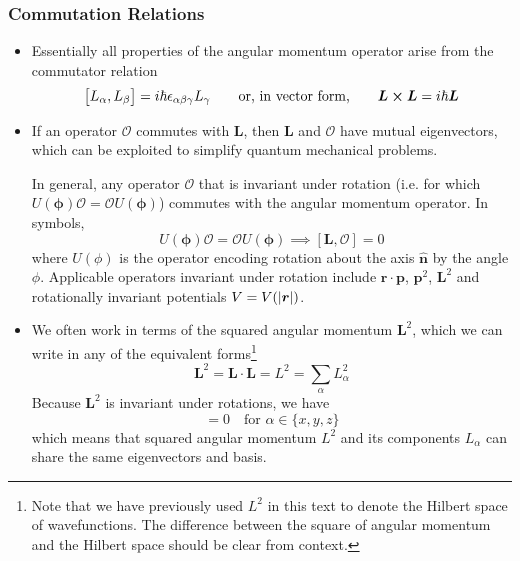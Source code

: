 \documentclass[11pt, a4paper]{article}
\newcommand{\eqtext}[1]{\qquad \text{#1} \qquad}
\renewcommand{\vec}[1]{\bm{#1}}  %
\newcommand{\uvec}[1]{\hat{\vec{#1}}}  %
\renewcommand{\r}{\vec{r}}  %
\renewcommand{\L}{\vec{L}}  %
\renewcommand{\O}{\mathcal{O}}  %
\begin{document}
\subsubsection{Commutation Relations}
\begin{itemize}
	\item Essentially all properties of the angular momentum operator arise from the commutator relation
	\begin{equation*}
		\big[L_{\alpha}, L_{\beta}\big] = i \hbar \epsilon_{\alpha \beta \gamma}L_{\gamma} \eqtext{or, in vector form,} \L \cross \L = i \hbar \L
	\end{equation*}
	
	\item If an operator $ \O $ commutes with $ \L $, then $ \L $ and $ \O $ have mutual eigenvectors, which can be exploited to simplify quantum mechanical problems.  
	
	In general, any operator $ \O $ that is invariant under rotation (i.e. for which $ U(\vec{\phi})\O = \O U(\vec{\phi})  $) commutes with the angular momentum operator. In symbols,
	\begin{equation*}
		U(\vec{\phi})\O = \O U(\vec{\phi})  \implies [\L, \O] = 0
	\end{equation*}
    where $ U(\phi) $ is the operator encoding rotation about the axis $ \uvec{n} $ by the angle $ \phi $. Applicable operators invariant under rotation include $ \r \cdot \vec{p} $, $ \vec{p}^{2} $, $ \L^{2} $ and rotationally invariant potentials $ V = V(\abs{\r}) $. 
	
	\item We often work in terms of the squared angular momentum $ \L^{2} $, which we can write in any of the equivalent forms\footnote{Note that we have previously used $ L^{2} $ in this text to denote the Hilbert space of wavefunctions. The difference between the square of angular momentum and the Hilbert space should be clear from context.}
	\begin{equation*}
		\L^{2} = \L \cdot \L = L^{2} = \sum_{\alpha} L_{\alpha}^{2}
	\end{equation*}
	Because $ \L^{2} $ is invariant under rotations, we have
	\begin{equation*}
		[L_{\alpha}, L^{2}] = 0 \quad \text{for } \alpha \in \{x, y, z\}
	\end{equation*}
	which means that squared angular momentum $ L^{2} $ and its components $ L_{\alpha} $ can share the same eigenvectors and basis.
	
\end{itemize}
\end{document}
